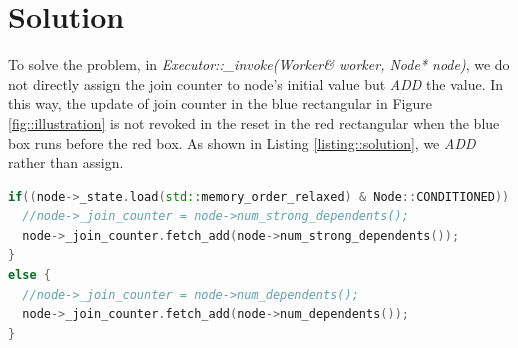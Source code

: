 \documentclass[11pt,twoside]{article}
\theoremstyle{plain}
\theoremstyle{definition}
\theoremstyle{remark}
\begin{document}
\section{Solution}

To solve the problem,
in \textit{Executor::\_invoke(Worker\& worker, Node* node)},
we do not directly assign the join counter to node's initial value but
\textit{ADD} the value.
In this way,
the update of join counter in the blue rectangular in Figure \ref{fig::illustration}
is not revoked in the reset in the red rectangular
when the blue box runs before the red box.
As shown in Listing \ref{listing::solution},
we \textit{ADD} rather than assign.
 

\begin{lstlisting}[language=C++,label=listing::solution,caption={Solution to the bug.}]
if((node->_state.load(std::memory_order_relaxed) & Node::CONDITIONED)) {
  //node->_join_counter = node->num_strong_dependents();
  node->_join_counter.fetch_add(node->num_strong_dependents());
}
else {
  //node->_join_counter = node->num_dependents();
  node->_join_counter.fetch_add(node->num_dependents());
}
\end{lstlisting}
\end{document}
